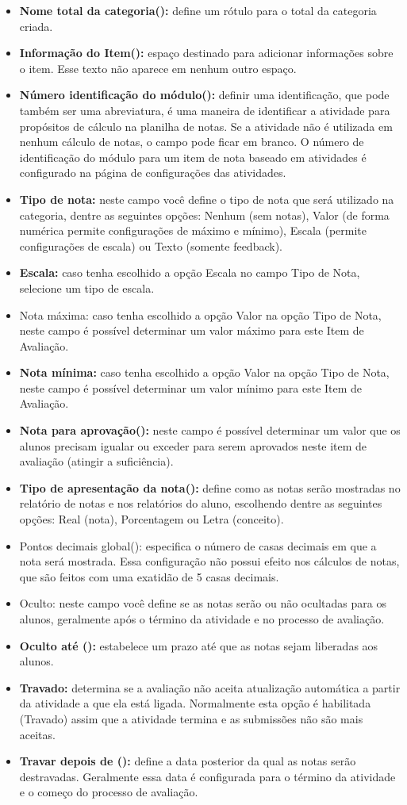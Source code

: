 \begin{itemize}
 \item \textbf{Nome total da categoria(\*):} define um rótulo para o total da categoria criada.
 \item \textbf{Informação do Item(\*):} espaço destinado para adicionar informações sobre o item. Esse texto não aparece em nenhum outro espaço.
 \item \textbf{Número identificação do módulo(\*):} definir uma identificação, que pode também ser uma abreviatura, é uma maneira de identificar a atividade para propósitos de cálculo na planilha de notas. Se a atividade não é utilizada em nenhum cálculo de notas, o campo pode ficar em branco. O número de identificação do módulo para um item de nota baseado em atividades é configurado na página de configurações das atividades.
 \item \textbf{Tipo de nota:} neste campo você define o tipo de nota que será utilizado na categoria, dentre as seguintes opções: Nenhum (sem notas), Valor (de forma numérica permite configurações de máximo e mínimo), Escala (permite configurações de escala) ou Texto (somente feedback).
 \item \textbf{Escala:} caso tenha escolhido a opção Escala no campo Tipo de Nota, selecione um tipo de escala.
 \item Nota máxima: caso tenha escolhido a opção Valor na opção Tipo de Nota, neste campo é possível determinar um valor máximo para este Item de Avaliação.
 \item \textbf{Nota mínima:} caso tenha escolhido a opção Valor na opção Tipo de Nota, neste campo é possível determinar um valor mínimo para este Item de Avaliação.
 \item \textbf{Nota para aprovação(\*):} neste campo é possível determinar um valor que os alunos precisam igualar ou exceder para serem aprovados neste item de avaliação (atingir a suficiência).
 \item \textbf{Tipo de apresentação da nota(\*):} define como as notas serão mostradas no relatório de notas e nos relatórios do aluno, escolhendo dentre as seguintes opções: Real (nota), Porcentagem ou Letra (conceito).
 \item Pontos decimais global(\*): especifica o número de casas decimais em que a nota será mostrada. Essa configuração não possui efeito nos cálculos de notas, que são feitos com uma exatidão de 5 casas decimais.
 \item Oculto: neste campo você define se as notas serão ou não ocultadas para os alunos, geralmente após o término da atividade e no processo de avaliação.
 \item \textbf{Oculto até (\*):} estabelece um prazo até que as notas sejam liberadas aos alunos.
 \item \textbf{Travado:} determina se a avaliação não aceita atualização automática a partir da atividade a que ela está ligada. Normalmente esta opção é habilitada (Travado) assim que a atividade termina e as submissões não são mais aceitas.
 \item \textbf{Travar depois de (\*):} define a data posterior da qual as notas serão destravadas. Geralmente essa data é configurada para o término da atividade e o começo do processo de avaliação.
\end{itemize}
